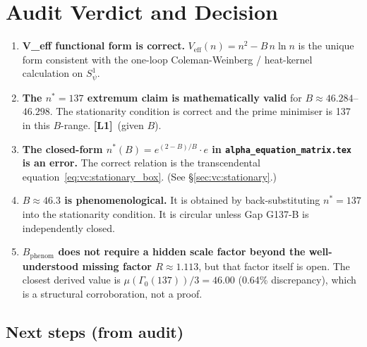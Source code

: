 \documentclass[12pt,a4paper]{article}
\theoremstyle{definition}
\theoremstyle{remark}
\newcommand{\Lone}{\textbf{[L1]}}
\begin{document}
\section{Audit Verdict and Decision}
\label{sec:vc:decision}

\begin{tcolorbox}[colback=blue!4!white,colframe=blue!50!black,title=Audit Verdict]
\begin{enumerate}
  \item \textbf{V\_eff functional form is correct.}
        $V_{\mathrm{eff}}(n) = n^2 - B\,n\ln n$ is the unique form consistent
        with the one-loop Coleman-Weinberg / heat-kernel calculation on $S^1_\psi$.

  \item \textbf{The $n^* = 137$ extremum claim is mathematically valid}
        for $B \approx 46.284$--$46.298$.  The stationarity condition is correct
        and the prime minimiser is 137 in this $B$-range. \Lone~(given $B$).

  \item \textbf{The closed-form $n^*(B) = e^{(2-B)/B}\cdot e$ in
        \texttt{alpha\_equation\_matrix.tex} is an error.}  The correct relation
        is the transcendental equation~\eqref{eq:vc:stationary_box}.
        (See \S\ref{sec:vc:stationary}.)

  \item \textbf{$B \approx 46.3$ is phenomenological.}
        It is obtained by back-substituting $n^* = 137$ into the stationarity
        condition.  It is circular unless Gap G137-B is independently closed.

  \item \textbf{$B_{\mathrm{phenom}}$ does not require a hidden scale factor beyond
        the well-understood missing factor $R \approx 1.113$}, but that factor
        itself is open.  The closest derived value is $\mu(\Gamma_0(137))/3 = 46.00$
        (0.64\% discrepancy), which is a structural corroboration, not a proof.
\end{enumerate}
\end{tcolorbox}

\subsection*{Next steps (from audit)}
\end{document}
